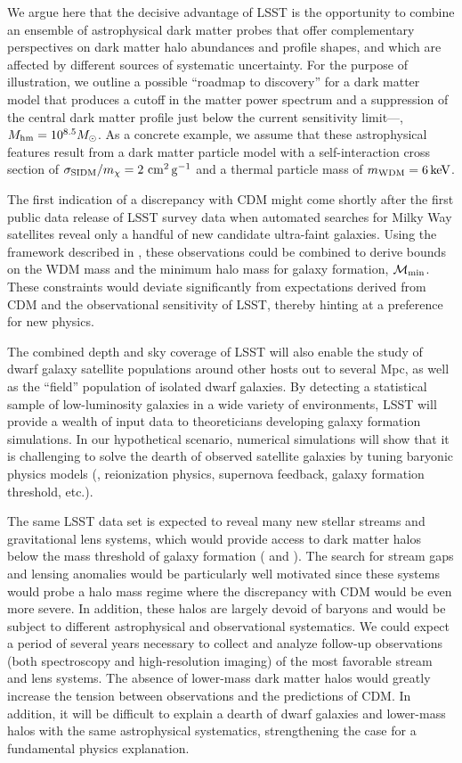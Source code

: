 We argue here that the decisive advantage of LSST is the opportunity to combine an ensemble of astrophysical dark matter probes that offer complementary perspectives on dark matter halo abundances and profile shapes, and which are affected by different sources of systematic uncertainty.
For the purpose of illustration, we outline a possible ``roadmap to discovery'' for a dark matter model that produces a cutoff in the matter power spectrum and a suppression of the central dark matter profile just below the current sensitivity limit---\ie, $M_{\rm hm} = 10^{8.5}M_\odot$.
As a concrete example, we assume that these astrophysical features result from a dark matter particle model with a self-interaction cross section of $\sigma_{\rm SIDM}/m_\chi = 2 \mathrm{\,\mathrm{\,cm}^2\mathrm{\,g}^{-1}}$ and a thermal particle mass of $m_{\rm WDM} = 6 \mathrm{\,keV}$.

The first indication of a discrepancy with CDM might come shortly after the first public data release of LSST survey data when automated searches for Milky Way satellites reveal only a handful of new candidate ultra-faint galaxies. 
Using the framework described in , these observations could be combined to derive bounds on the WDM mass and the minimum halo mass for galaxy formation, $\mathcal{M}_{\rm min}$. These constraints would deviate significantly from expectations derived from CDM and the observational sensitivity of LSST, thereby hinting at a preference for new physics.

The combined depth and sky coverage of LSST will also enable the study of dwarf galaxy satellite populations around other hosts out to several Mpc, as well as the ``field'' population of isolated dwarf galaxies.
By detecting a statistical sample of low-luminosity galaxies in a wide variety of environments, LSST will provide a wealth of input data to theoreticians developing galaxy formation simulations.
In our hypothetical scenario, numerical simulations will show that it is challenging to solve the dearth of observed satellite galaxies by tuning baryonic physics models (\eg, reionization physics, supernova feedback, galaxy formation threshold, etc.).

The same LSST data set is expected to reveal many new stellar streams and gravitational lens systems, which would provide access to dark matter halos below the mass threshold of galaxy formation ( and ).
The search for stream gaps and lensing anomalies would be particularly well motivated since these systems would probe a halo mass regime where the discrepancy with CDM would be even more severe.
In addition, these halos are largely devoid of baryons and would be subject to different astrophysical and observational systematics.
We could expect a period of several years necessary to collect and analyze follow-up observations (both spectroscopy and high-resolution imaging) of the most favorable stream and lens systems.
The absence of lower-mass dark matter halos would greatly increase the tension between observations and the predictions of CDM.
In addition, it will be difficult to explain a dearth of dwarf galaxies and lower-mass halos with the same astrophysical systematics, strengthening the case for a fundamental physics explanation.

